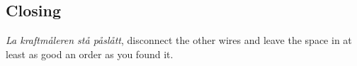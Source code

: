 \documentclass[../Elmag-labhefte-2022.tex]{subfiles}
\begin{document}
%


\subsection{Closing}
\emph{La kraftmåleren stå påslått}, disconnect the other wires and leave the space in at least as good an order as you found it.
\end{document}
